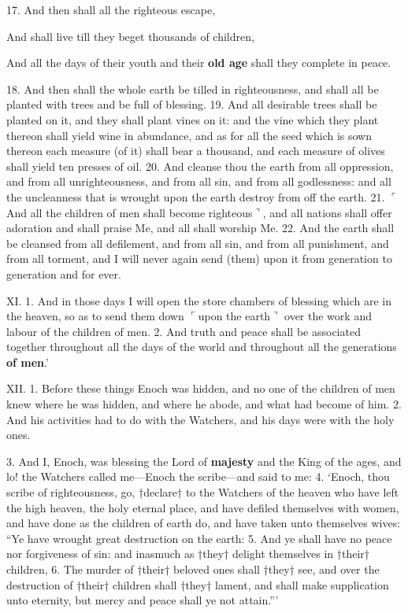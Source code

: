 17. And then shall all the righteous escape,

And shall live till they beget thousands of children,

And all the days of their youth and their \textbf{old age} shall they complete in peace.

18. And then shall the whole earth be tilled in righteousness,
and shall all be planted with trees and be
full of blessing. 19. And all desirable trees shall be
planted on it, and they shall plant vines on it: and
the vine which they plant thereon shall yield wine
in abundance, and as for all the seed which is sown
thereon each measure (of it) shall bear a thousand,
and each measure of olives shall yield ten presses
of oil. 20. And cleanse thou the earth from all
oppression, and from all unrighteousness, and from
all sin, and from all godlessness: and all the uncleanness
that is wrought upon the earth destroy
from off the earth. 21. $\ulcorner$And all the children of
men shall become righteous$\urcorner$, and all nations shall
offer adoration and shall praise Me, and all shall
worship Me. 22. And the earth shall be cleansed
from all defilement, and from all sin, and from all
punishment, and from all torment, and I will never
again send (them) upon it from generation to generation
and for ever.

XI. 1. And in those days I will open the store
chambers of blessing which are in the heaven, so as
to send them down $\ulcorner$upon the earth$\urcorner$ over the work
and labour of the children of men. 2. And truth
and peace shall be associated together throughout all
the days of the world and throughout all the generations
\textbf{of men}.’


XII. 1. Before these things Enoch was hidden, and
no one of the children of men knew where he was
hidden, and where he abode, and what had become
of him. 2. And his activities had to do with the
Watchers, and his days were with the holy ones.

3. And I, Enoch, was blessing the Lord of \textbf{majesty}
and the King of the ages, and lo! the Watchers
called me—Enoch the scribe—and said to me:
4. ‘Enoch, thou scribe of righteousness, go, †declare†
to the Watchers of the heaven who have left the
high heaven, the holy eternal place, and have defiled
themselves with women, and have done as the
children of earth do, and have taken unto themselves
wives: “Ye have wrought great destruction on the
earth: 5. And ye shall have no peace nor forgiveness
of sin: and inasmuch as †they† delight themselves
in †their† children, 6. The murder of †their†
beloved ones shall †they† see, and over the destruction
of †their† children shall †they† lament, and
shall make supplication unto eternity, but mercy and
peace shall ye not attain.”’

